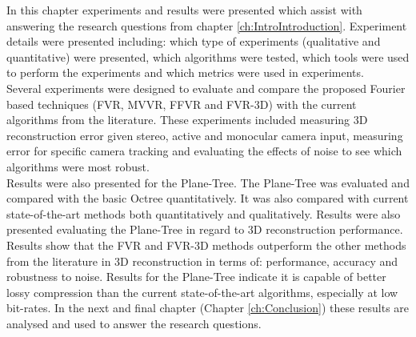 In this chapter experiments and results were presented which assist with answering the research questions from chapter \ref{ch:IntroIntroduction}. Experiment details were presented including: which type of experiments (qualitative and quantitative) were presented, which algorithms were tested, which tools were used to perform the experiments and which metrics were used in experiments. \\

Several experiments were designed to evaluate and compare the proposed Fourier based techniques (FVR, MVVR, FFVR and FVR-3D) with the current algorithms from the literature. These experiments included measuring 3D reconstruction error given stereo, active and monocular camera input, measuring error for specific camera tracking and evaluating the effects of noise to see which algorithms were most robust. \\

Results were also presented for the Plane-Tree. The Plane-Tree was evaluated and compared with the basic Octree quantitatively. It was also compared with current state-of-the-art methods both quantitatively and qualitatively. Results were also presented evaluating the Plane-Tree in regard to 3D reconstruction performance. \\

Results show that the FVR and FVR-3D methods outperform the other methods from the literature in 3D reconstruction in terms of: performance, accuracy and robustness to noise. Results for the Plane-Tree indicate it is capable of better lossy compression than the current state-of-the-art algorithms, especially at low bit-rates. In the next and final chapter (Chapter \ref{ch:Conclusion}) these results are analysed and used to answer the research questions. \\


